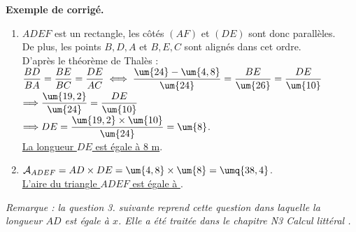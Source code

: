 \begin{activite}
   \textcolor{G1}{
   {\bf Exemple de corrigé.}
      \begin{enumerate}
         \item $ADEF$ est un rectangle, les côtés $(AF)$ et $(DE)$ sont donc parallèles. \\
            De plus, les points $B, D, A$ et $B, E, C$ sont alignés dans cet ordre. \\ [1mm]
            D'après le théorème de Thalès : $\dfrac{BD}{BA} =\dfrac{BE}{BC} =\dfrac{DE}{AC} \iff \dfrac{\um{24}-\um{4,8}}{\um{24}} =\dfrac{BE}{\um{26}} =\dfrac{DE}{\um{10}}$ \\ [1.5mm]
            \hspace*{7.5cm} $\Longrightarrow\dfrac{\um{19,2}}{\um{24}} =\dfrac{DE}{\um{10}}$ \\ [1.5mm]
            \hspace*{7.5cm} $\Longrightarrow DE =\dfrac{\um{19,2}\times\um{10}}{\um{24}} =\um{8}$. \\
            \uline{La longueur $DE$ est égale à 8 m}.
         \item $\mathcal{A}_{ADEF} =AD\times DE =\um{4,8}\times\um{8} =\umq{38,4}$. \\
            \uline{L'aire du triangle $ADEF$ est égale à }. \\
      \end{enumerate}}
      
   {\it Remarque : la question 3. suivante reprend cette question dans laquelle la longueur $AD$ est égale à $x$. Elle a été traitée dans le chapitre N3 \og Calcul littéral \fg.}
\end{activite}


\exercicesbase

